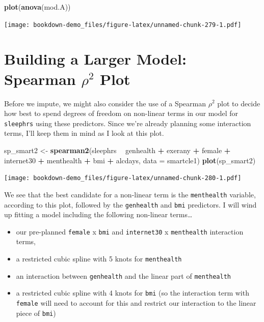 \documentclass[]{book}
\newenvironment{Shaded}{\begin{snugshade}}{\end{snugshade}}
\newcommand{\KeywordTok}[1]{\textcolor[rgb]{0.13,0.29,0.53}{\textbf{#1}}}
\newcommand{\DataTypeTok}[1]{\textcolor[rgb]{0.13,0.29,0.53}{#1}}
\newcommand{\StringTok}[1]{\textcolor[rgb]{0.31,0.60,0.02}{#1}}
\newcommand{\OperatorTok}[1]{\textcolor[rgb]{0.81,0.36,0.00}{\textbf{#1}}}
\newcommand{\NormalTok}[1]{#1}
\providecommand{\tightlist}{%
  \setlength{\itemsep}{0pt}\setlength{\parskip}{0pt}}
\theoremstyle{definition}
\theoremstyle{definition}
\theoremstyle{definition}
\theoremstyle{remark}
\begin{document}
\begin{Shaded}
\begin{Highlighting}[]
\KeywordTok{plot}\NormalTok{(}\KeywordTok{anova}\NormalTok{(mod.A))}
\end{Highlighting}
\end{Shaded}

\texttt{[image: bookdown-demo\_files/figure-latex/unnamed-chunk-279-1.pdf]}

\section{\texorpdfstring{Building a Larger Model: Spearman \(\rho^2\)
Plot}{Building a Larger Model: Spearman \textbackslash{}rho\^{}2 Plot}}\label{building-a-larger-model-spearman-rho2-plot-1}

Before we impute, we might also consider the use of a Spearman
\(\rho^2\) plot to decide how best to spend degrees of freedom on
non-linear terms in our model for \texttt{sleephrs} using these
predictors. Since we're already planning some interaction terms, I'll
keep them in mind as I look at this plot.

\begin{Shaded}
\begin{Highlighting}[]
\NormalTok{sp_smart2 <-}\StringTok{ }\KeywordTok{spearman2}\NormalTok{(sleephrs }\OperatorTok{~}\StringTok{ }\NormalTok{genhealth }\OperatorTok{+}\StringTok{ }\NormalTok{exerany }\OperatorTok{+}\StringTok{ }
\StringTok{                          }\NormalTok{female }\OperatorTok{+}\StringTok{ }\NormalTok{internet30 }\OperatorTok{+}\StringTok{ }\NormalTok{menthealth }\OperatorTok{+}\StringTok{ }
\StringTok{                          }\NormalTok{bmi }\OperatorTok{+}\StringTok{ }\NormalTok{alcdays, }\DataTypeTok{data =}\NormalTok{ smartcle1)}
\KeywordTok{plot}\NormalTok{(sp_smart2)}
\end{Highlighting}
\end{Shaded}

\texttt{[image: bookdown-demo\_files/figure-latex/unnamed-chunk-280-1.pdf]}

We see that the best candidate for a non-linear term is the
\texttt{menthealth} variable, according to this plot, followed by the
\texttt{genhealth} and \texttt{bmi} predictors. I will wind up fitting a
model including the following non-linear terms\ldots{}

\begin{itemize}
\tightlist
\item
  our pre-planned \texttt{female} x \texttt{bmi} and \texttt{internet30}
  x \texttt{menthealth} interaction terms,
\item
  a restricted cubic spline with 5 knots for \texttt{menthealth}
\item
  an interaction between \texttt{genhealth} and the linear part of
  \texttt{menthealth}
\item
  a restricted cubic spline with 4 knots for \texttt{bmi} (so the
  interaction term with \texttt{female} will need to account for this
  and restrict our interaction to the linear piece of \texttt{bmi})
\end{itemize}
\end{document}
